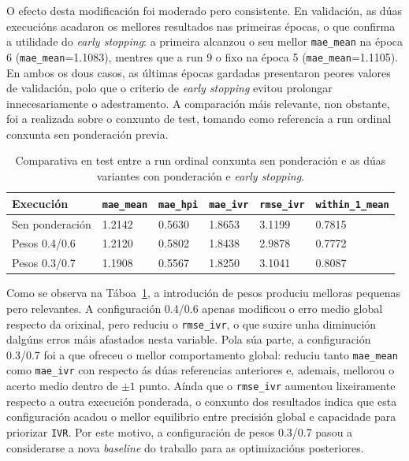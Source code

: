 O efecto desta modificación foi moderado pero consistente. En validación, as dúas execucións
acadaron os mellores resultados nas primeiras épocas, o que confirma a utilidade do
\textit{early stopping}: a primeira alcanzou o seu mellor \texttt{mae\_mean} na época 6
(\texttt{mae\_mean}=1.1083), mentres que a run 9 o fixo na época 5
(\texttt{mae\_mean}=1.1105). En ambos os dous casos, as últimas épocas gardadas presentaron peores
valores de validación, polo que o criterio de \textit{early stopping} evitou prolongar innecesariamente o
adestramento. A comparación máis relevante, non obstante, foi a realizada sobre o conxunto de test,
tomando como referencia a run ordinal conxunta sen ponderación previa.

{
\begin{table}[htbp]
    \centering
    \footnotesize
    \setlength{\tabcolsep}{4pt}
    \begin{tabular}{p{}|p{}|p{}|p{}|p{}|p{}}
        \rowcolor{udcpink!25}
        \textbf{Execución} & \textbf{\texttt{mae\_mean}} & \textbf{\texttt{mae\_hpi}} & \textbf{\texttt{mae\_ivr}} & \textbf{\texttt{rmse\_ivr}} & \textbf{\texttt{within\_1\_mean}} \\\hline
        Sen ponderación & 1.2142 & 0.5630 & 1.8653 & 3.1199 & 0.7815 \\
        Pesos 0.4/0.6 & 1.2120 & 0.5802 & 1.8438 & 2.9878 & 0.7772 \\
        Pesos 0.3/0.7 & 1.1908 & 0.5567 & 1.8250 & 3.1041 & 0.8087 \\
    \end{tabular}
    \caption{Comparativa en test entre a run ordinal conxunta sen ponderación e as dúas variantes con ponderación e \textit{early stopping}.}
    \label{tab:comparativa-weighted-earlystopping}
\end{table}
}

Como se observa na Táboa~\ref{tab:comparativa-weighted-earlystopping}, a introdución de pesos
produciu melloras pequenas pero relevantes. A configuración 0.4/0.6 
apenas modificou o erro medio global respecto da orixinal, pero reduciu o \texttt{rmse\_ivr}, o que
suxire unha diminución dalgúns erros máis afastados nesta variable. Pola súa parte, a configuración
0.3/0.7 foi a que ofreceu o mellor comportamento global: reduciu tanto
\texttt{mae\_mean} como \texttt{mae\_ivr} con respecto ás dúas referencias anteriores e, ademais,
mellorou o acerto medio dentro de $\pm 1$ punto. Aínda que o \texttt{rmse\_ivr} aumentou
lixeiramente respecto a outra execución ponderada, o conxunto dos resultados indica que esta configuración acadou o
mellor equilibrio entre precisión global e capacidade para priorizar \texttt{IVR}. Por este motivo,
a configuración de pesos 0.3/0.7 pasou a considerarse a nova \textit{baseline} do traballo para as optimizacións
posteriores.

